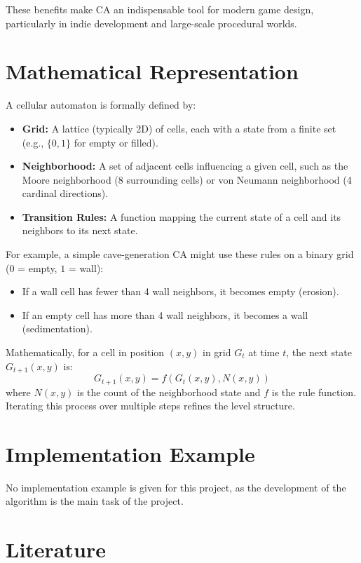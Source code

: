 \documentclass{article}
\begin{document}
These benefits make CA an indispensable tool for modern game design, particularly in indie development and large-scale procedural worlds.

\section{Mathematical Representation}

A cellular automaton is formally defined by:

\begin{itemize}
    \item \textbf{Grid:} A lattice (typically 2D) of cells, each with a state from a finite set (e.g., $\{0, 1\}$ for empty or filled).
    \item \textbf{Neighborhood:} A set of adjacent cells influencing a given cell, such as the Moore neighborhood (8 surrounding cells) or von Neumann neighborhood (4 cardinal directions).
    \item \textbf{Transition Rules:} A function mapping the current state of a cell and its neighbors to its next state.
\end{itemize}

For example, a simple cave-generation CA might use these rules on a binary grid ($0$ = empty, $1$ = wall):
\begin{itemize}
    \item If a wall cell has fewer than 4 wall neighbors, it becomes empty (erosion).
    \item If an empty cell has more than 4 wall neighbors, it becomes a wall (sedimentation).
\end{itemize}

Mathematically, for a cell in position $(x, y)$ in grid $G_t$ at time $t$, the next state $G_{t+1}(x, y)$ is:
\[
G_{t+1}(x, y) = f(G_t(x, y), N(x, y))
\]
where $N(x, y)$ is the count of the neighborhood state and $f$ is the rule function. Iterating this process over multiple steps refines the level structure.

\section{Implementation Example}

No implementation example is given for this project, as the development of the algorithm is the main task of the project.  

\section{Literature}
\end{document}
